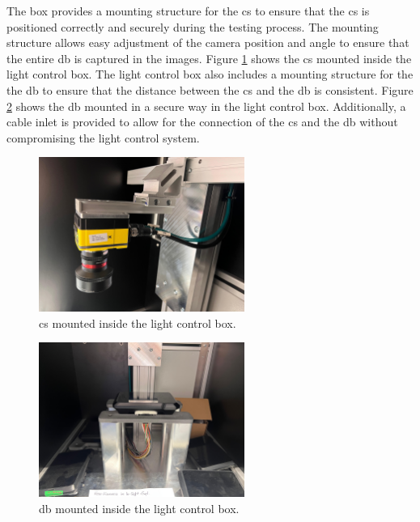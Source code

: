 The box provides a mounting structure for the \gls{cs} to ensure that the \gls{cs} is positioned correctly and securely during the testing process. The mounting structure allows easy adjustment of the camera position and angle to ensure that the entire \gls{db} is captured in the images. Figure \ref{Camera_Mounting} shows the \gls{cs} mounted inside the light control box. The light control box also includes a mounting structure for the the \gls{db} to ensure that the distance between the \gls{cs} and the \gls{db} is consistent. Figure \ref{db_Mounting} shows the \gls{db} mounted in a secure way in the light control box. Additionally, a cable inlet is provided to allow for the connection of the \gls{cs} and the \gls{db} without compromising the light control system.

\begin{figure}[!htb]
    \centering
    \includegraphics[width=0.6\textwidth]{Figures/Camera_Mounting.jpg}
    \caption{\gls{cs} mounted inside the light control box.}
    \label{Camera_Mounting}
\end{figure}

\begin{figure}[!htb]
    \centering
    \includegraphics[width=0.6\textwidth]{Figures/db_mounting.jpg}
    \caption{\gls{db} mounted inside the light control box.}
    \label{db_Mounting}
\end{figure}



